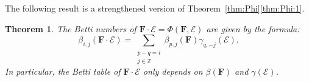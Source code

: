 \documentclass[12pt]{amsart}
\newtheorem{theorem}[lemma]{Theorem}
\theoremstyle{definition}
\theoremstyle{remark}
\newcommand{\ZZ}{\mathbb{Z}}
\newcommand{\cE}{\mathcal{E}}
\newcommand{\FF}{\mathbf{F}}
\begin{document}
The following result is a strengthened version of Theorem~\ref{thm:Phi}\eqref{thm:Phi:1}.
\begin{theorem}\label{thm:betti numbers of pairing}
The Betti numbers of $\FF\cdot \cE = \Phi(\FF,\cE)$ are given by the formula:
\[
\beta_{i,j}(\FF\cdot \cE)=\sum_{\substack{p-q=i\\ j\in \ZZ}}  \beta_{p,j}(\FF)\gamma_{q,-j}(\cE).
\]
In particular, the Betti table of $\FF\cdot \cE$ only depends on $\beta(\FF)$ and $\gamma(\cE)$.
\end{theorem}
\end{document}
